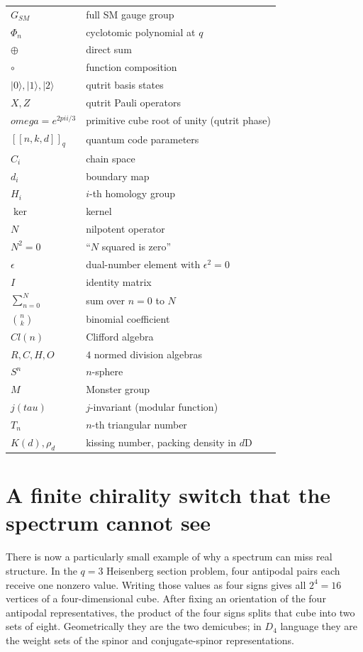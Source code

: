 \documentclass[11pt]{article}
\def\mathbb#1{#1}%
\def\mathrm#1{#1}%
\def\omega{omega}%
\def\Phi#1{Phi#1}%
\def\pi{pi}%
\def\tau{tau}%
\begin{document}
\begin{center}
\begin{tabular}{l l}
$G_{SM}$ & full SM gauge group \\
$\Phi_n$ & cyclotomic polynomial at $q$ \\
$\oplus$ & direct sum \\
$\circ$ & function composition \\
$|0\rangle, |1\rangle, |2\rangle$ & qutrit basis states \\
$X, Z$ & qutrit Pauli operators \\
$\omega = e^{2\pi i/3}$ & primitive cube root of unity (qutrit phase) \\
$[[n, k, d]]_q$ & quantum code parameters \\
$C_i$ & chain space \\
$d_i$ & boundary map \\
$H_i$ & $i$-th homology group \\
$\ker$ & kernel \\
$N$ & nilpotent operator \\
$N^2 = 0$ & ``$N$ squared is zero'' \\
$\epsilon$ & dual-number element with $\epsilon^2 = 0$ \\
$I$ & identity matrix \\
$\sum_{n=0}^{N}$ & sum over $n = 0$ to $N$ \\
$\binom{n}{k}$ & binomial coefficient \\
$\mathrm{Cl}(n)$ & Clifford algebra \\
$\mathbb{R}, \mathbb{C}, \mathbb{H}, \mathbb{O}$ & $4$ normed division algebras \\
$S^n$ & $n$-sphere \\
$\mathbb{M}$ & Monster group \\
$j(\tau)$ & $j$-invariant (modular function) \\
$T_n$ & $n$-th triangular number \\
$K(d), \rho_d$ & kissing number, packing density in $d$D \\
\bottomrule
\end{tabular}
\end{center}

\section{A finite chirality switch that the spectrum cannot see}

There is now a particularly small example of why a spectrum can miss real
structure.  In the $q=3$ Heisenberg section problem, four antipodal pairs each
receive one nonzero value.  Writing those values as four signs gives all
$2^4=16$ vertices of a four-dimensional cube.  After fixing an orientation of
the four antipodal representatives, the product of the four signs splits that
cube into two sets of eight.  Geometrically they are the two
demicubes; in $D_4$ language they are the weight sets of the spinor and
conjugate-spinor representations.
\end{document}
